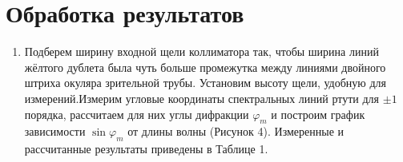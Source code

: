 \documentclass{article}
\begin{document}
\section{Обработка результатов}
\begin{enumerate}

\item Подберем ширину входной щели коллиматора так, чтобы ширина линий жёлтого
дублета была чуть больше промежутка между линиями двойного штриха окуляра
зрительной трубы. Установим высоту щели, удобную для измерений.Измерим угловые координаты спектральных линий ртути для $\pm 1$ порядка, рассчитаем для них углы дифракции $\varphi_{m}$ и построим график зависимости  $\sin \varphi_{m}$ от длины волны (Рисунок 4). Измеренные и рассчитанные результаты приведены в Таблице 1.


\begin{table}[h!]
\end{table}
\end{enumerate}
\end{document}
